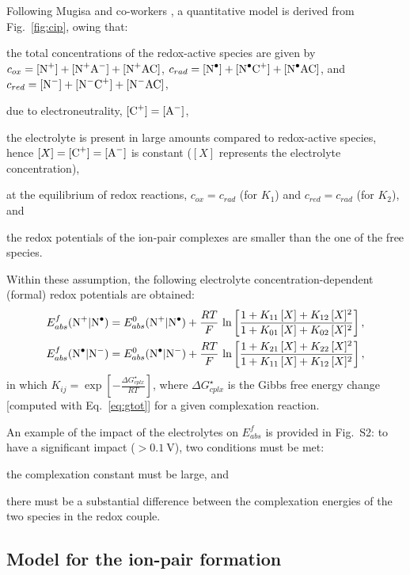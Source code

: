 \documentclass[review,preprint]{elsarticle}
\begin{document}
Following Mugisa and co-workers \cite{mugisaEffectIonparingKinetics2024}, a quantitative model is derived from Fig.~\ref{fig:cip}, owing that: \begin{inparaenum}[(i)]
	\item the total concentrations of the redox-active species are given by $c_{ox} = [\ce{N+}] + [\ce{N+A-}] + [\ce{N+AC}]$, $c_{rad} = [\ce{N^.}] + [\ce{N^.C+}] + [\ce{N^.AC}]$, and $c_{red} =  [\ce{N-}] + [\ce{N^-C+}] + [\ce{N^-AC}]$,
	\item due to electroneutrality, $ [\ce{C+}] = [\ce{A-}] $,
	\item the electrolyte is present in large amounts compared to redox-active species, hence $[X] = [\ce{C+}] = [\ce{A-}] $ is constant ($[X]$ represents the electrolyte concentration),
	\item at the equilibrium of redox reactions, $c_{ox} = c_{rad}$ (for $K_1$) and $c_{red} = c_{rad}$ (for $K_2$), and
	\item the redox potentials of the ion-pair complexes are smaller than the one of the free species.
\end{inparaenum}
Within these assumption, the following electrolyte concentration-dependent (formal) redox potentials are obtained:\begin{align}
	E^f_{abs}(\ce{N+|N^.}) &= E^0_ {abs}(\ce{N+|N^.})+\frac{RT}{F}\,\ln\left[\frac{1+K_{11}\,[X]+K_{12}\,[X]^2}{1+K_{01}\,[X]+K_{02}\,[X]^2}\right],\label{eq:ef1}\\
	E^f_{abs}(\ce{N^.|N-}) &= E^0_ {abs}(\ce{N^.|N-})+\frac{RT}{F}\,\ln\left[\frac{1+K_{21}\,[X]+K_{22}\,[X]^2}{1+K_{11}\,[X]+K_{12}\,[X]^2}\right],\label{eq:ef2}
\end{align}
in which $K_{ij}= \exp\left[-\frac{\Delta G_{cplx}^\star}{RT}\right]$, where $\Delta G_{cplx}^\star$ is the Gibbs free energy change [computed with Eq.~\eqref{eq:gtot}] for a given complexation reaction.

An example of the impact of the electrolytes on $E^f_{abs}$ is provided in Fig.~S2: to have a significant impact ($>\SI{0.1}{\volt}$), two conditions must be met: \begin{inparaenum}[(i)]
	\item the complexation constant must be large, and
	\item there must be a substantial difference between the complexation energies of the two species in the redox couple.
\end{inparaenum}

\subsection{Model for the ion-pair formation}
\end{document}
